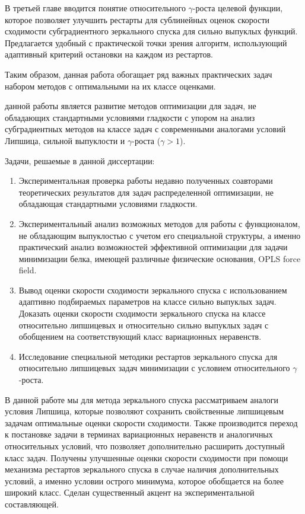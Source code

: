 В третьей главе вводится понятие относительного $\gamma$-роста целевой функции, которое позволяет улучшить рестарты для сублинейных оценок скорости сходимости субградиентного зеркального спуска для сильно выпуклых функций. Предлагается удобный с практической точки зрения алгоритм, использующий адаптивный критерий остановки на каждом из рестартов. 

Таким образом, данная работа обогащает ряд важных практических задач набором методов с оптимальными на их классе оценками.


{\aim} данной работы является развитие методов оптимизации для задач, не обладающих стандартными условиями гладкости с упором на анализ субградиентных методов на классе задач с современными аналогами условий Липшица, сильной выпуклости и $\gamma$-роста ($\gamma > 1$).

Задачи, решаемые в данной диссертации:
\begin{enumerate}
    \item Экспериментальная проверка работы недавно полученных соавторами теоретических результатов для задач распределенной оптимизации, не обладающая стандартными условиями гладкости.
    \item Экспериментальный анализ возможных методов для работы с функционалом, не обладающим выпуклостью с учетом его специальной структуры, а именно практический анализ возможностей эффективной оптимизации для задачи минимизации белка, имеющей различные физические основания,  OPLS force field. 
    \item Вывод оценки скорости сходимости зеркального спуска с использованием адаптивно подбираемых параметров на классе сильно выпуклых задач. Доказать оценки скорости сходимости зеркального спуска на классе относительно липшицевых и относительно сильно выпуклых задач с обобщением на соответствующий класс вариационных неравенств.
    \item Исследование специальной методики рестартов зеркального спуска для относительно липшицевых задач минимизации с условием относительного $\gamma$-роста. 
\end{enumerate}
В данной работе мы для метода зеркального спуска рассматриваем аналоги условия Липшица, которые позволяют сохранить свойственные липшицевым задачам оптимальные оценки скорости сходимости. Также производится переход к постановке задачи в терминах вариационных неравенств и аналогичных относительных условий, что позволяет дополнительно расширить доступный класс задач. Получены улучшенные оценки скорости сходимости при помощи механизма рестартов зеркального спуска в случае наличия дополнительных условий, а именно условии острого минимума, которое обобщается на более широкий класс. Сделан существенный акцент на экспериментальной составляющей.

